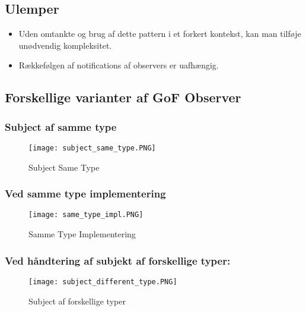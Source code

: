 \documentclass[../SWD_disp.tex]{subfiles}
\begin{document}
\subsection*{Ulemper}
\begin{itemize}
    \item Uden omtankte og brug af dette pattern i et forkert kontekst, kan man tilføje unødvendig kompleksitet.
    \item Rækkefølgen af notifications af observers er uafhængig.
\end{itemize}

\subsection*{Forskellige varianter af GoF Observer}
\subsubsection*{Subject af samme type}
\begin{figure}[H]
    \centering
    \texttt{[image: subject\_same\_type.PNG]}
    \caption{Subject Same Type}
    \label{fig:subject_same_type}
\end{figure}


\subsubsection*{Ved samme type implementering}
\begin{figure}[H]
    \centering
    \texttt{[image: same\_type\_impl.PNG]}
    \caption{Samme Type Implementering}
    \label{fig:same_type_impl}
\end{figure}

\subsubsection*{Ved håndtering af subjekt af forskellige typer:}
\begin{figure}[H]
    \centering
    \texttt{[image: subject\_different\_type.PNG]}
    \caption{Subject af forskellige typer}
    \label{fig:subject_diff_type}
\end{figure}
\end{document}
